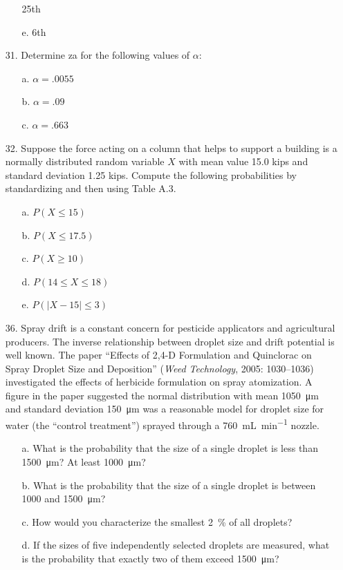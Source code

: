 \documentclass[letterpaper,12pt]{article}
\begin{document}
\begin{enumerate}
\begin{enumerate}
        25th
      \item[e.]
        6th
    \end{enumerate}
  \item[31.]
    Determine za for the following values of $\alpha$:
    \begin{enumerate}
      \item[a.]
        $\alpha = .0055$
      \item[b.]
        $\alpha = .09$
      \item[c.]
        $\alpha = .663$
    \end{enumerate}
  \item[32.]
    Suppose the force acting on a column that helps to support a building is a normally distributed random variable $X$ with mean value 15.0 kips and standard deviation 1.25 kips. Compute the following probabilities by standardizing and then using Table A.3.
    \begin{enumerate}
      \item[a.]
        $P(X \le 15)$
      \item[b.]
        $P(X \le 17.5)$
      \item[c.]
        $P(X \ge 10)$
      \item[d.]
        $P(14 \le X \le 18)$
      \item[e.]
        $P(|X - 15| \le 3)$
    \end{enumerate}
  \item[36.]
    Spray drift is a constant concern for pesticide applicators and agricultural producers. The inverse relationship between droplet size and drift potential is well known. The paper ``Effects of 2,4-D Formulation and Quinclorac on Spray Droplet Size and Deposition'' (\textit{Weed Technology}, 2005: 1030–1036) investigated the effects of herbicide formulation on spray atomization. A figure in the paper suggested the normal distribution with mean \qty{1050}{\micro\meter} and standard deviation \qty{150}{\micro\meter} was a reasonable model for droplet size for water (the ``control treatment'') sprayed through a \qty{760}{\milli\liter\per\minute} nozzle.
    \begin{enumerate}
      \item[a.]
        What is the probability that the size of a single droplet is less than \qty{1500}{\micro\meter}? At least \qty{1000}{\micro\meter}?
      \item[b.]
        What is the probability that the size of a single droplet is between 1000 and \qty{1500}{\micro\meter}?
      \item[c.]
        How would you characterize the smallest \qty{2}{\percent} of all droplets?
      \item[d.]
        If the sizes of five independently selected droplets are measured, what is the probability that exactly two of them exceed \qty{1500}{\micro\meter}?
    \end{enumerate}
\end{enumerate}
\end{document}
